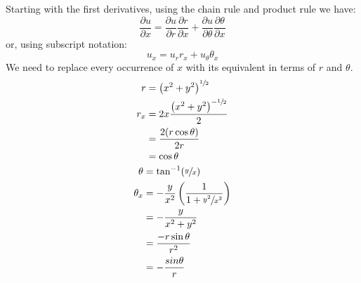Starting with the first derivatives, using the chain rule and product rule we have:
\begin{equation*}
\frac{\partial u}{\partial x} = \frac{\partial u}{\partial r}\frac{\partial r}{\partial x} + \frac{\partial u}{\partial \theta} \frac{\partial \theta}{\partial x}
\end{equation*}
or, using subscript notation:
\begin{equation*}
u_x = u_r r_x + u_{\theta} \theta_x
\end{equation*}
We need to replace every occurrence of $x$ with its equivalent in terms of $r$ and $\theta$. 
\begin{align*}
r &= \left(x^2 + y^2\right)^{\sfrac{1}{2}} \\
r_x &= 2x \frac{\left(x^2 +y^2\right)^{-\sfrac{1}{2}}}{2} \\
&= \frac{2(r \cos{\theta})}{2r} \\
&= \cos{\theta}
\end{align*}
\begin{align*}
\theta &= \tan^{-1}(\sfrac{y}{x}) \\
\theta_x &= -\frac{y}{x^2}\left(\frac{1}{1+\sfrac{y^2}{x^2}}\right) \\
&= -\frac{y}{x^2 + y^2} \\
&= \frac{-r \sin{\theta}}{r^2} \\
&= -\frac{sin{\theta}}{r}
\end{align*}
